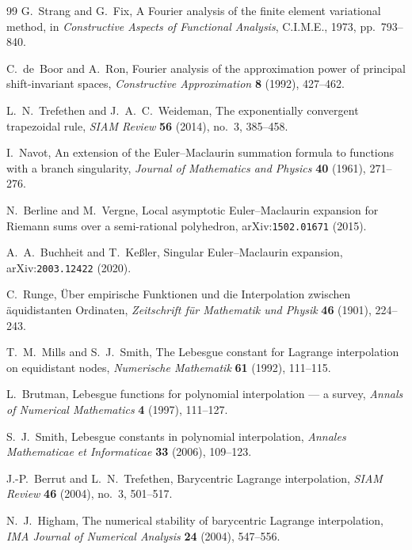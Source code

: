 \documentclass[11pt,oneside]{article}
\numberwithin{equation}{section}
\theoremstyle{definition}
\theoremstyle{remark}
\begin{document}
\begin{thebibliography}{99}
G.~Strang and G.~Fix,
\newblock A Fourier analysis of the finite element variational
method,
\newblock in \emph{Constructive Aspects of Functional Analysis},
C.I.M.E., 1973, pp.~793--840.

C.~de~Boor and A.~Ron,
\newblock Fourier analysis of the approximation power of principal
shift-invariant spaces,
\newblock \emph{Constructive Approximation} \textbf{8} (1992),
427--462.

L.~N.~Trefethen and J.~A.~C.~Weideman,
\newblock The exponentially convergent trapezoidal rule,
\newblock \emph{SIAM Review} \textbf{56} (2014), no.~3, 385--458.

I.~Navot,
\newblock An extension of the Euler--Maclaurin summation formula to
functions with a branch singularity,
\newblock \emph{Journal of Mathematics and Physics} \textbf{40}
(1961), 271--276.

N.~Berline and M.~Vergne,
\newblock Local asymptotic Euler--Maclaurin expansion for Riemann
sums over a semi-rational polyhedron,
\newblock arXiv:\nolinkurl{1502.01671} (2015).

A.~A.~Buchheit and T.~Ke{\ss}ler,
\newblock Singular Euler--Maclaurin expansion,
\newblock arXiv:\nolinkurl{2003.12422} (2020).

C.~Runge,
\newblock \"Uber empirische Funktionen und die Interpolation
zwischen \"aquidistanten Ordinaten,
\newblock \emph{Zeitschrift f\"ur Mathematik und Physik}
\textbf{46} (1901), 224--243.

T.~M.~Mills and S.~J.~Smith,
\newblock The Lebesgue constant for Lagrange interpolation on
equidistant nodes,
\newblock \emph{Numerische Mathematik} \textbf{61} (1992), 111--115.

L.~Brutman,
\newblock Lebesgue functions for polynomial interpolation --- a
survey,
\newblock \emph{Annals of Numerical Mathematics} \textbf{4} (1997),
111--127.

S.~J.~Smith,
\newblock Lebesgue constants in polynomial interpolation,
\newblock \emph{Annales Mathematicae et Informaticae} \textbf{33}
(2006), 109--123.

J.-P.~Berrut and L.~N.~Trefethen,
\newblock Barycentric Lagrange interpolation,
\newblock \emph{SIAM Review} \textbf{46} (2004), no.~3, 501--517.

N.~J.~Higham,
\newblock The numerical stability of barycentric Lagrange
interpolation,
\newblock \emph{IMA Journal of Numerical Analysis} \textbf{24}
(2004), 547--556.


\end{thebibliography}
\end{document}
